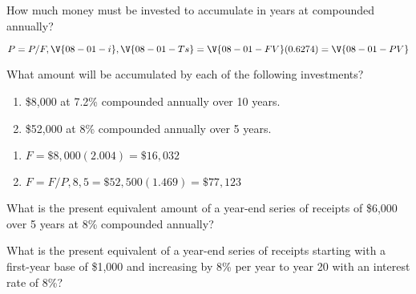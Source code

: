 

\begin{exercises}
    \begin{exercise}
    \label{sea-08-01}
        How much money must be invested to accumulate  in  years at  compounded annually?
    \end{exercise}
    \begin{solution}
        \begin{equation}
            P=P/F, \V{08-01-i}, \V{08-01-Ts}= \V{08-01-FV}(0.6274)= \V{08-01-PV}
        \end{equation}
    \end{solution}
    
    \begin{exercise}
    \label{sea-08-02}
        What amount will be accumulated by each of the following investments?
        \begin{enumerate}[label=\alph*)]
            \item \$8,000 at 7.2\% compounded annually over 10 years.
            \item \$52,000 at 8\% compounded annually over 5 years.
        \end{enumerate}
    \end{exercise}
    \begin{solution}
        \begin{enumerate}[label=\alph*)]
            \item $F=\$8,000(2.004)=\$16,032$
            \item $F=F/P,8,5=\$52,500(1.469)=\$77,123$
        \end{enumerate}
    \end{solution}
    
    \begin{exercise}
    \label{sea-08-03}
        What is the present equivalent amount of a year-end series of receipts of \$6,000 over 5 years at 8\% compounded annually?
    \end{exercise}
    \begin{solution}
    \end{solution}
    
    \begin{exercise}
    \label{sea-08-04}
        What is the present equivalent of a year-end series of receipts starting with a first-year base of \$1,000 and increasing by 8\% per year to year 20 with an interest rate of 8\%?
    \end{exercise}
    \begin{solution}
    \end{solution}
    

\end{exercises}
